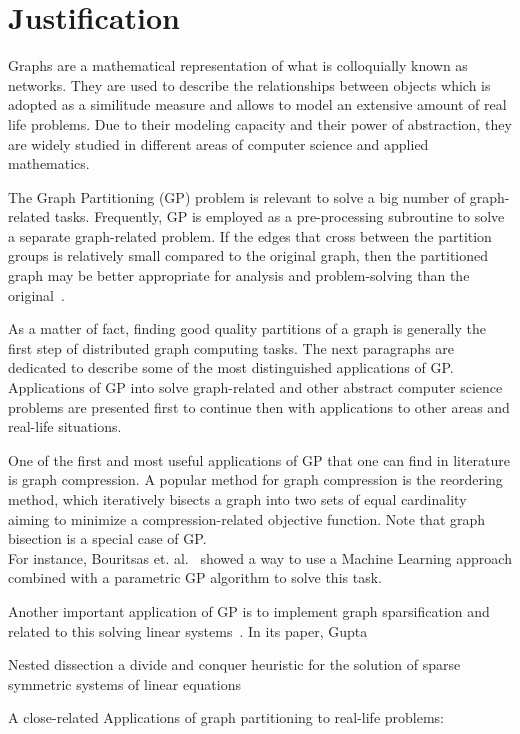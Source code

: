 \section{Justification}

Graphs are a mathematical representation of what is colloquially known as networks. They are used to describe the relationships between objects which is adopted as a similitude measure and allows to model an extensive amount of real life problems. Due to their modeling capacity and their power of abstraction, they are widely studied in different areas of computer science and applied mathematics. 

The Graph Partitioning (GP) problem is relevant to solve a big number of graph-related tasks. Frequently, GP is employed as a pre-processing subroutine to solve a separate graph-related problem. If the edges that cross between the partition groups is relatively small compared to the original graph, then the partitioned graph may be better appropriate for analysis and problem-solving than the original~\cite{bettersuited}. 

As a matter of fact, finding good quality partitions of a graph is generally the first step of distributed graph computing tasks. The next paragraphs are dedicated to describe some of the most distinguished applications of GP.
Applications of GP into solve graph-related and other abstract computer science problems are presented first to continue then with applications to other areas and real-life situations.

One of the first and most useful applications of GP that one can find in literature is graph compression. A popular method for graph compression is the reordering method, which iteratively bisects a graph into two sets of equal cardinality aiming to minimize a compression-related objective function. Note that graph bisection is a special case of GP.\\ For instance, Bouritsas et. al.~\cite{compressgraphs} showed a way to use a Machine Learning approach combined with a parametric GP algorithm to solve this task.

Another important application of GP is to implement graph sparsification and related to this solving linear systems~\cite{sparcification}. In its paper, Gupta~\cite{matrixordering}

Nested dissection a divide and conquer heuristic for the solution of sparse symmetric systems of linear equations~\cite{nesteddissection}

A close-related 
Applications of graph partitioning to real-life problems:

